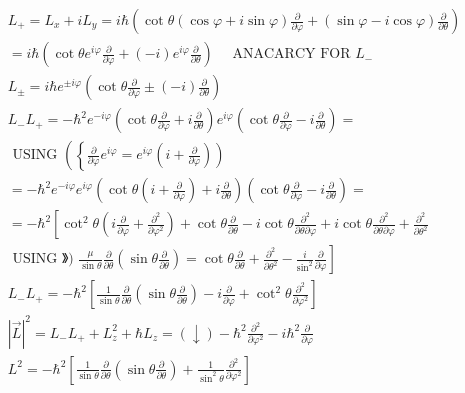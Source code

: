 \documentclass[10pt]{article}
\begin{document}
\begin{align*}
& L_{+}=L_{x}+i L_{y}=i \hbar\left(\cot \theta(\cos \varphi+i \sin \varphi) \frac{\partial}{\partial \varphi}+(\sin \varphi-i \cos \varphi) \frac{\partial}{\partial \theta}\right) \\
& =i \hbar\left(\cot \theta e^{i \varphi} \frac{\partial}{\partial \varphi}+(-i) e^{i \varphi} \frac{\partial}{\partial \theta}\right) \quad \text { ANACARCY FOR } L_{-} \\
& L_{ \pm}=i \hbar e^{ \pm i \varphi}\left(\cot \theta \frac{\partial}{\partial \varphi} \pm(-i) \frac{\partial}{\partial \theta}\right) \\
& L_{-} L_{+}=-\hbar^{2} e^{-i \varphi}\left(\cot \theta \frac{\partial}{\partial \varphi}+i \frac{\partial}{\partial \theta}\right) e^{i \varphi}\left(\cot \theta \frac{\partial}{\partial \varphi}-i \frac{\partial}{\partial \theta}\right)= \\
& \text { USING }\left(\left\{\frac{\partial}{\partial \varphi} e^{i \varphi}=e^{i \varphi}\left(i+\frac{\partial}{\partial \varphi}\right)\right)\right. \\
& =-\hbar^{2} e^{-i \varphi} e^{i \varphi}\left(\cot \theta\left(i+\frac{\partial}{\partial \varphi}\right)+i \frac{\partial}{\partial \theta}\right)\left(\cot \theta \frac{\partial}{\partial \varphi}-i \frac{\partial}{\partial \theta}\right)= \\
& =-\hbar^{2}\left[\cot ^{2} \theta\left(i \frac{\partial}{\partial \varphi}+\frac{\partial^{2}}{\partial \varphi^{2}}\right)+\cot \theta \frac{\partial}{\partial \theta}-i \cot \theta \frac{\partial^{2}}{\partial \theta \partial \varphi}+i \cot \theta \frac{\partial^{2}}{\partial \theta \partial \varphi}+\frac{\partial^{2}}{\partial \theta^{2}}\right. \\
& \text { USING 》) } \left.\frac{\mu}{\sin \theta} \frac{\partial}{\partial \theta}\left(\sin \theta \frac{\partial}{\partial \theta}\right)=\cot \theta \frac{\partial}{\partial \theta}+\frac{\partial^{2}}{\partial \theta^{2}}-\frac{i}{\sin ^{2}} \frac{\partial}{\partial \varphi}\right] \\
& L_{-} L_{+}=-\hbar^{2}\left[\frac{1}{\sin \theta} \frac{\partial}{\partial \theta}\left(\sin \theta \frac{\partial}{\partial \theta}\right)-i \frac{\partial}{\partial \varphi}+\cot ^{2} \theta \frac{\partial^{2}}{\partial \varphi^{2}}\right] \\
& |\vec{L}|^{2}=L_{-} L_{+}+L_{z}^{2}+\hbar L_{z}=(\downarrow)-\hbar^{2} \frac{\partial^{2}}{\partial \varphi^{2}}-i \hbar^{2} \frac{\partial}{\partial \varphi} \\
& L^{2}=-\hbar^{2}\left[\frac{1}{\sin \theta} \frac{\partial}{\partial \theta}\left(\sin \theta \frac{\partial}{\partial \theta}\right)+\frac{1}{\sin ^{2} \theta} \frac{\partial^{2}}{\partial \varphi^{2}}\right] \tag{$\omega$}
\end{align*}
\end{document}
